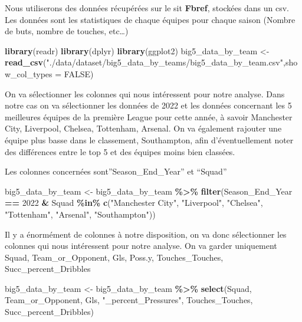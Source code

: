 \documentclass[
]{article}
\newenvironment{Shaded}{\begin{snugshade}}{\end{snugshade}}
\newcommand{\AttributeTok}[1]{\textcolor[rgb]{0.13,0.29,0.53}{#1}}
\newcommand{\ConstantTok}[1]{\textcolor[rgb]{0.56,0.35,0.01}{#1}}
\newcommand{\DecValTok}[1]{\textcolor[rgb]{0.00,0.00,0.81}{#1}}
\newcommand{\FunctionTok}[1]{\textcolor[rgb]{0.13,0.29,0.53}{\textbf{#1}}}
\newcommand{\NormalTok}[1]{#1}
\newcommand{\OtherTok}[1]{\textcolor[rgb]{0.56,0.35,0.01}{#1}}
\newcommand{\SpecialCharTok}[1]{\textcolor[rgb]{0.81,0.36,0.00}{\textbf{#1}}}
\newcommand{\StringTok}[1]{\textcolor[rgb]{0.31,0.60,0.02}{#1}}
\begin{document}
Nous utiliserons des données récupérées sur le sit \textbf{Fbref},
stockées dans un csv. Les données sont les statistiques de chaque
équipes pour chaque saison (Nombre de buts, nombre de touches,
etc\ldots)

\begin{Shaded}
\begin{Highlighting}[]
\FunctionTok{library}\NormalTok{(readr)}
\FunctionTok{library}\NormalTok{(dplyr)}
\FunctionTok{library}\NormalTok{(ggplot2)}
\NormalTok{big5\_data\_by\_team }\OtherTok{\textless{}{-}} \FunctionTok{read\_csv}\NormalTok{(}\StringTok{"./data/dataset/big5\_data\_by\_teams/big5\_data\_by\_team.csv"}\NormalTok{,}\AttributeTok{show\_col\_types =} \ConstantTok{FALSE}\NormalTok{)}
\end{Highlighting}
\end{Shaded}

On va sélectionner les colonnes qui nous intéressent pour notre analyse.
Dans notre cas on va sélectionner les données de 2022 et les données
concernant les 5 meilleures équipes de la première League pour cette
année, à savoir Manchester City, Liverpool, Chelsea, Tottenham, Arsenal.
On va également rajouter une équipe plus basse dans le classement,
Southampton, afin d'éventuellement noter des différences entre le top 5
et des équipes moins bien classées.

Les colonnes concernées sont''Season\_End\_Year'' et ``Squad''

\begin{Shaded}
\begin{Highlighting}[]
\NormalTok{big5\_data\_by\_team }\OtherTok{\textless{}{-}}\NormalTok{ big5\_data\_by\_team }\SpecialCharTok{\%\textgreater{}\%} \FunctionTok{filter}\NormalTok{(Season\_End\_Year }\SpecialCharTok{==} \DecValTok{2022} \SpecialCharTok{\&}\NormalTok{ Squad }\SpecialCharTok{\%in\%} \FunctionTok{c}\NormalTok{(}\StringTok{"Manchester City"}\NormalTok{, }\StringTok{"Liverpool"}\NormalTok{, }\StringTok{"Chelsea"}\NormalTok{, }\StringTok{"Tottenham"}\NormalTok{, }\StringTok{"Arsenal"}\NormalTok{, }\StringTok{"Southampton"}\NormalTok{))}
\end{Highlighting}
\end{Shaded}

Il y a énormément de colonnes à notre disposition, on va donc
sélectionner les colonnes qui nous intéressent pour notre analyse. On va
garder uniquement Squad, Team\_or\_Opponent, Gls, Poss.y,
Touches\_Touches, Succ\_percent\_Dribbles

\begin{Shaded}
\begin{Highlighting}[]
\NormalTok{big5\_data\_by\_team }\OtherTok{\textless{}{-}}\NormalTok{ big5\_data\_by\_team }\SpecialCharTok{\%\textgreater{}\%} \FunctionTok{select}\NormalTok{(Squad, Team\_or\_Opponent, Gls, }\StringTok{"\_percent\_Pressures"}\NormalTok{, Touches\_Touches, Succ\_percent\_Dribbles)}
\end{Highlighting}
\end{Shaded}
\end{document}

